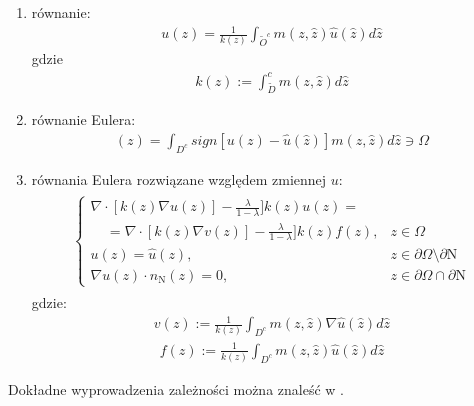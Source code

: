 \documentclass[12pt, twoside, openany]{report}
\theoremstyle{definition}
\begin{document}
\begin{enumerate}
\item
równanie:
\begin{align}
u(z) = \frac{1}{k(z)}\int_{\widetilde O^c}m(z,\hat{z})\hat{u}(\hat{z})d\hat{z}
\end{align}
gdzie
\begin{align}
k(z) := \int_{\widetilde D}^c m(z,\hat{z})d\hat{z}
\end{align}
\item
równanie Eulera:
\begin{align}
[\delta_{u}\mathcal{E}(u)](z) = \int_{D^c}sign[u(z)-\hat{u}(\hat{z})]m(z,\hat{z})d\hat{z} \ni \Omega 
\end{align}
\item
równania Eulera rozwiązane względem zmiennej $u$:
\begin{align}
\begin{aligned}
\begin{cases}
\nabla \cdot [k(z)\nabla u(z)] - \frac{\lambda}{1-\lambda}]k(z)u(z) = \\ 
\ \ \ \ \ = \nabla \cdot [k(z)\nabla v(z)] - \frac{\lambda}{1-\lambda}]k(z)f(z) , & z \in \Omega \\
u(z)=\hat{u}(z) , & z \in \partial \Omega \setminus \partial \mathrm{N} \\
\nabla u(z) \cdot n_{\mathrm{N}}(z) = 0 , & z \in \partial \Omega \cap \partial \mathrm{N}
\end{cases}
\end{aligned}
\end{align}
gdzie:
\begin{align}
v(z) := \frac{1}{k(z)}\int_{D^c}m(z,\hat{z})\nabla\hat{u}(\hat{z})d\hat{z}
\end{align}
\begin{align}
f(z) := \frac{1}{k(z)}\int_{D^c}m(z,\hat{z})\hat{u}(\hat{z})d\hat{z}
\end{align}
\end{enumerate}
Dokładne wyprowadzenia zależności można znaleść w \cite{arias2011variational}.
\end{document}
